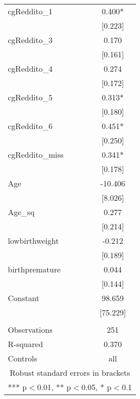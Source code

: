 \documentclass[]{article}
\begin{document}
\begin{tabular}{lc}
cgReddito\_1 & 0.400* \\
 & [0.223] \\
cgReddito\_3 & 0.170 \\
 & [0.161] \\
cgReddito\_4 & 0.274 \\
 & [0.172] \\
cgReddito\_5 & 0.313* \\
 & [0.180] \\
cgReddito\_6 & 0.451* \\
 & [0.250] \\
cgReddito\_miss & 0.341* \\
 & [0.178] \\
Age & -10.406 \\
 & [8.026] \\
Age\_sq & 0.277 \\
 & [0.214] \\
lowbirthweight & -0.212 \\
 & [0.189] \\
birthpremature & 0.044 \\
 & [0.144] \\
Constant & 98.659 \\
 & [75.229] \\
 &  \\
Observations & 251 \\
R-squared & 0.370 \\
 Controls & all \\ \hline
\multicolumn{2}{c}{ Robust standard errors in brackets} \\
\multicolumn{2}{c}{ *** p$<$0.01, ** p$<$0.05, * p$<$0.1} \\
\end{tabular}
\end{document}
